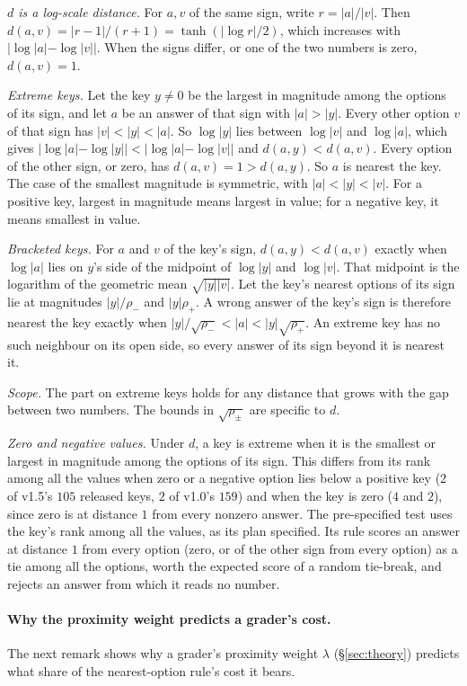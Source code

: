 \documentclass{article}
\begin{document}
\emph{$d$ is a log-scale distance.} For $a,v$ of the same sign, write $r=|a|/|v|$. Then
$d(a,v)=|r-1|/(r+1)=\tanh(|\log r|/2)$, which increases with $|\log|a|-\log|v||$. When the signs differ, or one of
the two numbers is zero, $d(a,v)=1$.

\emph{Extreme keys.} Let the key $y\ne0$ be the largest in magnitude among the options of its sign, and let $a$ be an
answer of that sign with $|a|>|y|$. Every other option $v$ of that sign has $|v|<|y|<|a|$. So $\log|y|$ lies between
$\log|v|$ and $\log|a|$, which gives $|\log|a|-\log|y||<|\log|a|-\log|v||$ and $d(a,y)<d(a,v)$. Every option of the
other sign, or zero, has $d(a,v)=1>d(a,y)$. So $a$ is nearest the key. The case of the smallest magnitude is
symmetric, with $|a|<|y|<|v|$. For a positive key, largest in magnitude means largest in value; for a negative key,
it means smallest in value.

\emph{Bracketed keys.} For $a$ and $v$ of the key's sign, $d(a,y)<d(a,v)$ exactly when $\log|a|$ lies on $y$'s side
of the midpoint of $\log|y|$ and $\log|v|$. That midpoint is the logarithm of the geometric mean $\sqrt{|y||v|}$. Let
the key's nearest options of its sign lie at magnitudes $|y|/\rho_-$ and $|y|\rho_+$. A wrong answer of the key's
sign is therefore nearest the key exactly when $|y|/\sqrt{\rho_-}<|a|<|y|\sqrt{\rho_+}$. An extreme key has no such
neighbour on its open side, so every answer of its sign beyond it is nearest it.

\emph{Scope.} The part on extreme keys holds for any distance that grows with the gap between two numbers. The bounds
in $\sqrt{\rho_\pm}$ are specific to $d$.

\emph{Zero and negative values.} Under $d$, a key is extreme when it is the smallest or largest in magnitude among the
options of its sign. This differs from its rank among all the values when zero or a negative option lies below a
positive key ($2$ of v1.5's $105$ released keys, $2$ of v1.0's $159$) and when the key is zero ($4$ and $2$), since
zero is at distance $1$ from every nonzero answer. The pre-specified test uses the key's rank among all the values,
as its plan specified. Its rule scores an answer at distance $1$ from every option (zero, or of the other sign from every
option) as a tie among all the options, worth the expected score of a random tie-break, and rejects an answer from
which it reads no number.

\paragraph{Why the proximity weight predicts a grader's cost.} The next remark shows why a grader's proximity weight
$\lambda$ (\S\ref{sec:theory}) predicts what share of the nearest-option rule's cost it bears.
\end{document}
